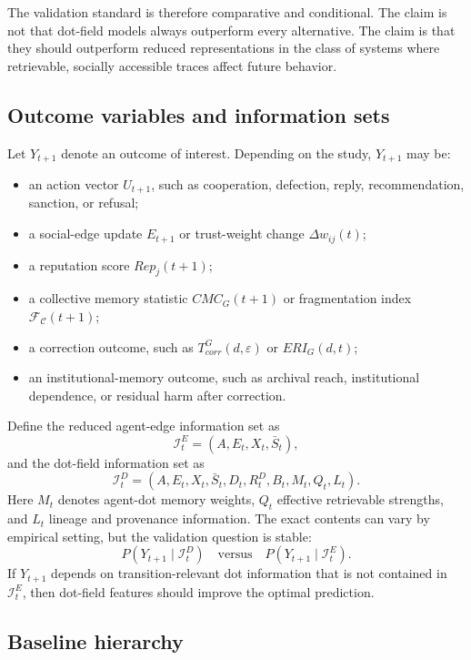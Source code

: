 \documentclass[11pt]{article}
\theoremstyle{remark}
\begin{document}
The validation standard is therefore comparative and conditional. The claim is
not that dot-field models always outperform every alternative. The claim is that
they should outperform reduced representations in the class of systems where
retrievable, socially accessible traces affect future behavior.

\subsection{Outcome variables and information sets}\label{outcomes-information-sets}

Let \(Y_{t+1}\) denote an outcome of interest. Depending on the study,
\(Y_{t+1}\) may be:

\begin{itemize}[leftmargin=*]
\item an action vector \(U_{t+1}\), such as cooperation, defection, reply,
recommendation, sanction, or refusal;
\item a social-edge update \(E_{t+1}\) or trust-weight change
\(\Delta w_{ij}(t)\);
\item a reputation score \(Rep_j(t+1)\);
\item a collective memory statistic \(CMC_G(t+1)\) or fragmentation index
\(\mathcal F_{\mathcal C}(t+1)\);
\item a correction outcome, such as \(T_{corr}^{G}(d,\varepsilon)\) or
\(ERI_G(d,t)\);
\item an institutional-memory outcome, such as archival reach,
institutional dependence, or residual harm after correction.
\end{itemize}

Define the reduced agent-edge information set as
\[
\mathcal I_t^{E}=(A,E_t,X_t,\bar S_t),
\]
and the dot-field information set as
\[
\mathcal I_t^{D}=(A,E_t,X_t,\bar S_t,D_t,R_t^D,B_t,M_t,Q_t,L_t).
\]
Here \(M_t\) denotes agent-dot memory weights, \(Q_t\) effective retrievable
strengths, and \(L_t\) lineage and provenance information. The exact contents
can vary by empirical setting, but the validation question is stable:
\[
P(Y_{t+1}\mid \mathcal I_t^{D})
\quad \text{versus} \quad
P(Y_{t+1}\mid \mathcal I_t^{E}).
\]
If \(Y_{t+1}\) depends on transition-relevant dot information that is not
contained in \(\mathcal I_t^E\), then dot-field features should improve the
optimal prediction.

\subsection{Baseline hierarchy}\label{baseline-hierarchy}
\end{document}

